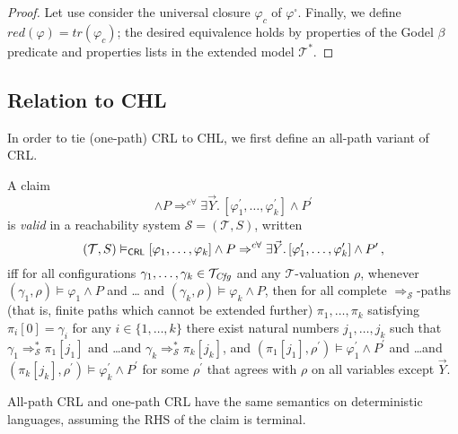 \begin{proof}
Let use consider the universal closure $\varphi_c$ of $\varphi^\square$.
Finally, we define $\mathit{red}(\varphi) = \mathit{tr}(\varphi_c)$; the desired equivalence holds by
properties of the Godel $\beta$ predicate and properties lists in the extended model $\mathcal{T}^*$.

\end{proof}

\subsection{Relation to CHL}\label{app:reltoCHL}

In order to tie (one-path) CRL to CHL, we first define an all-path variant of CRL.
\begin{definition}\label{def:apCRLsemantics}
    A claim
    \begin{equation*}
     [\varphi_1,\ldots,\varphi_k] \land P
     \Rightarrow^{c\forall} \exists \vec{Y}.\, [\varphi^\prime_1,\ldots,\varphi^\prime_k] \land P^\prime
    \end{equation*}
    is \emph{valid} in a reachability system $\mathcal{S} = (\mathcal{T}, S)$,
    written
    \begin{equation*}
        (\mathcal{T}, S) \vDash_{\mathsf{CRL}} [\varphi_1,\ldots,\varphi_k] \land P
     \Rightarrow^{c\forall} \exists \vec{Y}.\, [\varphi^\prime_1,\ldots,\varphi^\prime_k] \land P^\prime \, ,
    \end{equation*}
    iff for all configurations $\gamma_1,\ldots,\gamma_k \in \mathcal{T}_{\mathit{Cfg}}$
    and any $\mathcal{T}$-valuation $\rho$,
    whenever $(\gamma_1,\rho) \vDash \varphi_1 \land P$ and \ldots
    and $(\gamma_k,\rho) \vDash \varphi_k \land P$,
    then for all complete $\Rightarrow_{\mathcal{S}}$-paths (that is, finite paths which cannot be extended further)
    $\pi_1,\ldots,\pi_k$
    satisfying $\pi_i[0] = \gamma_i$ for any $i \in \{ 1, \ldots, k \}$
    there exist natural numbers $j_1, \ldots, j_k$
    such that $\gamma_1 \Rightarrow^{*}_{\mathcal{S}} \pi_1[j_1]$
    and \ldots and $\gamma_k \Rightarrow^{*}_{\mathcal{S}} \pi_k[j_k]$,
    and $(\pi_1[j_1], \rho^\prime) \vDash \varphi^\prime_1 \land P^\prime$
    and \ldots and $(\pi_k[j_k], \rho^\prime) \vDash \varphi^\prime_k \land P^\prime$
    for some $\rho^\prime$ that agrees with $\rho$ on all variables except $\vec{Y}$.
\end{definition}

All-path CRL and one-path CRL have the same semantics on deterministic languages, assuming the RHS of the claim is terminal.


